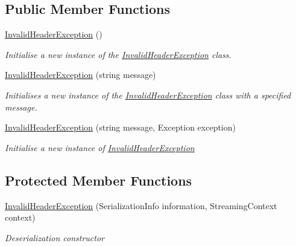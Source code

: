 \subsection*{Public Member Functions}
\begin{DoxyCompactItemize}
\item 
\hyperlink{class_i_c_sharp_code_1_1_sharp_zip_lib_1_1_tar_1_1_invalid_header_exception_a08d60c02784d3f06e56a7ccc138489c7}{Invalid\+Header\+Exception} ()
\begin{DoxyCompactList}\small\item\em Initialise a new instance of the \hyperlink{class_i_c_sharp_code_1_1_sharp_zip_lib_1_1_tar_1_1_invalid_header_exception}{Invalid\+Header\+Exception} class. \end{DoxyCompactList}\item 
\hyperlink{class_i_c_sharp_code_1_1_sharp_zip_lib_1_1_tar_1_1_invalid_header_exception_a71730ed35ff06c3cad1b48f42428515d}{Invalid\+Header\+Exception} (string message)
\begin{DoxyCompactList}\small\item\em Initialises a new instance of the \hyperlink{class_i_c_sharp_code_1_1_sharp_zip_lib_1_1_tar_1_1_invalid_header_exception}{Invalid\+Header\+Exception} class with a specified message. \end{DoxyCompactList}\item 
\hyperlink{class_i_c_sharp_code_1_1_sharp_zip_lib_1_1_tar_1_1_invalid_header_exception_ada419ef48dce2ff525546feb3fa4df08}{Invalid\+Header\+Exception} (string message, Exception exception)
\begin{DoxyCompactList}\small\item\em Initialise a new instance of \hyperlink{class_i_c_sharp_code_1_1_sharp_zip_lib_1_1_tar_1_1_invalid_header_exception}{Invalid\+Header\+Exception} \end{DoxyCompactList}\end{DoxyCompactItemize}
\subsection*{Protected Member Functions}
\begin{DoxyCompactItemize}
\item 
\hyperlink{class_i_c_sharp_code_1_1_sharp_zip_lib_1_1_tar_1_1_invalid_header_exception_a9f810fbe877b25b0369e7ed5fabb769f}{Invalid\+Header\+Exception} (Serialization\+Info information, Streaming\+Context context)
\begin{DoxyCompactList}\small\item\em Deserialization constructor \end{DoxyCompactList}\end{DoxyCompactItemize}


